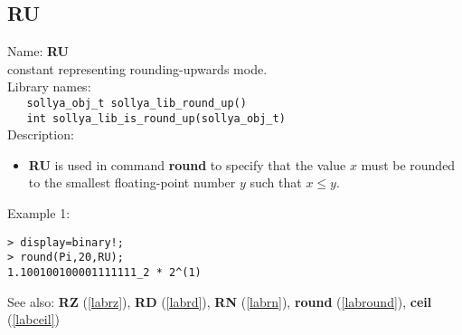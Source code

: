 \subsection{RU}
\label{labru}
\noindent Name: \textbf{RU}\\
\phantom{aaa}constant representing rounding-upwards mode.\\[0.2cm]
\noindent Library names:\\
\verb|   sollya_obj_t sollya_lib_round_up()|\\
\verb|   int sollya_lib_is_round_up(sollya_obj_t)|\\[0.2cm]
\noindent Description: \begin{itemize}

\item \textbf{RU} is used in command \textbf{round} to specify that the value $x$ must be rounded
   to the smallest floating-point number $y$ such that $x \le y$.
\end{itemize}
\noindent Example 1: 
\begin{center}\begin{minipage}{15cm}\begin{Verbatim}[frame=single,commandchars=\\\|\~]
> display=binary!;
> round(Pi,20,RU);
1.100100100001111111_2 * 2^(1)
\end{Verbatim}
\end{minipage}\end{center}
See also: \textbf{RZ} (\ref{labrz}), \textbf{RD} (\ref{labrd}), \textbf{RN} (\ref{labrn}), \textbf{round} (\ref{labround}), \textbf{ceil} (\ref{labceil})
